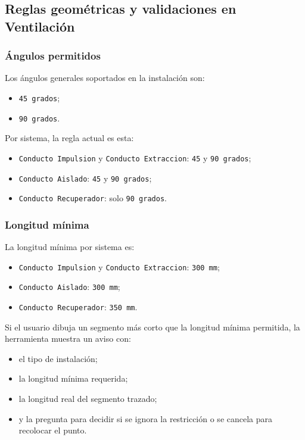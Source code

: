 \documentclass[12pt,a4paper]{article}
\begin{document}
\subsection{Reglas geométricas y validaciones en Ventilación}

\subsubsection{Ángulos permitidos}

Los ángulos generales soportados en la instalación son:

\begin{itemize}
\item \texttt{45 grados};
\item \texttt{90 grados}.
\end{itemize}

Por sistema, la regla actual es esta:

\begin{itemize}
\item \texttt{Conducto Impulsion} y \texttt{Conducto Extraccion}: \texttt{45} y \texttt{90 grados};
\item \texttt{Conducto Aislado}: \texttt{45} y \texttt{90 grados};
\item \texttt{Conducto Recuperador}: solo \texttt{90 grados}.
\end{itemize}

\subsubsection{Longitud mínima}

La longitud mínima por sistema es:

\begin{itemize}
\item \texttt{Conducto Impulsion} y \texttt{Conducto Extraccion}: \texttt{300 mm};
\item \texttt{Conducto Aislado}: \texttt{300 mm};
\item \texttt{Conducto Recuperador}: \texttt{350 mm}.
\end{itemize}

Si el usuario dibuja un segmento más corto que la longitud mínima permitida, la herramienta muestra un aviso con:

\begin{itemize}
\item el tipo de instalación;
\item la longitud mínima requerida;
\item la longitud real del segmento trazado;
\item y la pregunta para decidir si se ignora la restricción o se cancela para recolocar el punto.
\end{itemize}
\end{document}
